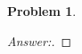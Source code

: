 \documentclass[11pt]{article}
\theoremstyle{definition}
\theoremstyle{definition}
\newtheorem{required}{Problem}
\theoremstyle{definition}
\begin{document}
\begin{required}
\begin{enumerate}[(a)]
\begin{proof}[Answer:]
\end{proof}




\end{enumerate}

\end{required}

\end{document}
